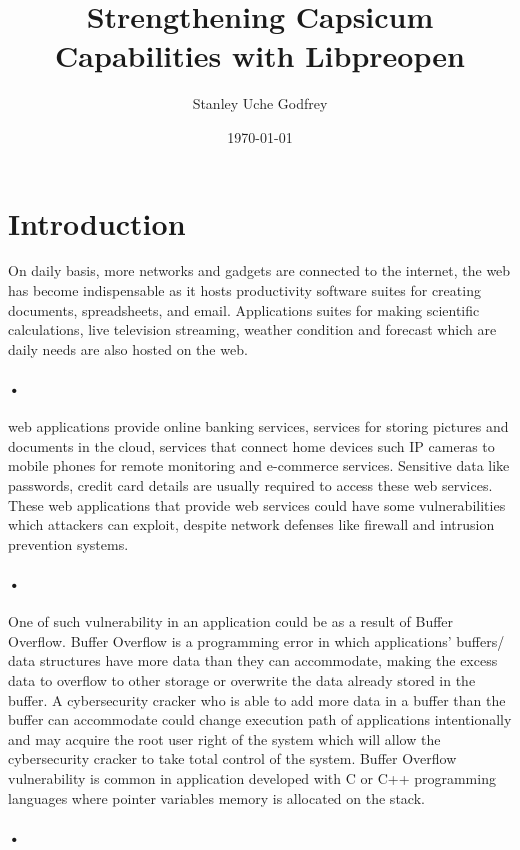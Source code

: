 \documentclass{article}
\title{Strengthening Capsicum Capabilities with Libpreopen}
\author{Stanley Uche Godfrey}
\date{\today}
\begin{document}
 
\maketitle
 
\section{Introduction}
On daily basis, more networks and gadgets are connected to the internet, the web has become indispensable as it hosts productivity software suites for creating documents, spreadsheets, and email. Applications suites for making scientific calculations, live television streaming, weather condition and forecast which are daily needs are also hosted on the web.\paragraph*{•}
  
web applications provide online banking services, services for storing pictures and documents
in the cloud, services that connect home devices such IP cameras to mobile phones for remote monitoring and e-commerce services. Sensitive data like passwords, credit card details are usually required to access these web services. These web applications that provide web services could have some vulnerabilities which attackers can exploit, despite network defenses like firewall and intrusion prevention systems. \paragraph*{•}

One of such vulnerability in an application could be as a result of   Buffer Overflow. Buffer Overflow is a programming error in which applications'  buffers/ data structures have more data than they can accommodate, making the excess data to overflow to other storage or overwrite the data already stored in the buffer.  A cybersecurity cracker who is able to add more data in a buffer than the buffer can accommodate could change execution path of applications intentionally and may acquire the root user right of the system which will allow the cybersecurity cracker to take total control of the system. Buffer Overflow vulnerability is common in application developed with C or C++ programming languages where pointer variables memory is allocated on the stack.\paragraph*{•}
\end{document}
